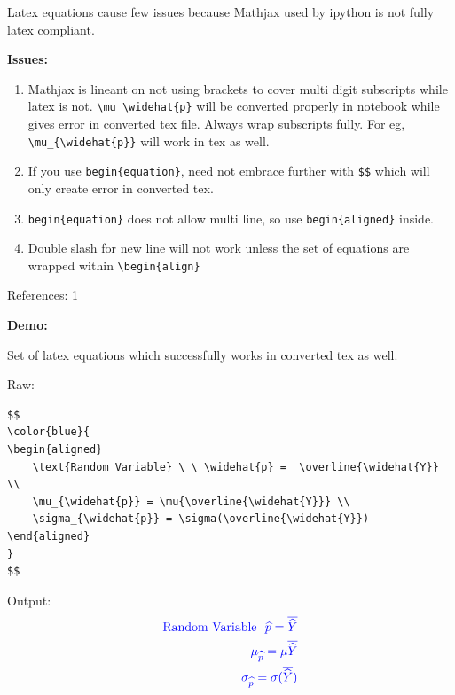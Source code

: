\documentclass[float=false,crop=false]{standalone}
\begin{document}
Latex equations cause few issues because Mathjax used by ipython is not
fully latex compliant.

\textbf{Issues:}

\begin{enumerate}
\def\labelenumi{\arabic{enumi}.}
\tightlist
\item
  Mathjax is lineant on not using brackets to cover multi digit
  subscripts while latex is not.
  \texttt{\textbackslash{}mu\_\textbackslash{}widehat\{p\}} will be
  converted properly in notebook while gives error in converted tex
  file. Always wrap subscripts fully. For eg,
  \texttt{\textbackslash{}mu\_\{\textbackslash{}widehat\{p\}\}} will
  work in tex as well.
\item
  If you use \texttt{begin\{equation\}}, need not embrace further with
  \texttt{\$\$} which will only create error in converted tex.
\item
  \texttt{begin\{equation\}} does not allow multi line, so use
  \texttt{begin\{aligned\}} inside.
\item
  Double slash for new line will not work unless the set of equations
  are wrapped within \texttt{\textbackslash{}begin\{align\}}
\end{enumerate}

References: \href{https://github.com/jupyter/nbconvert/issues/881}{1}

\textbf{Demo:}

Set of latex equations which successfully works in converted tex as
well.

Raw:

\begin{verbatim}
$$
\color{blue}{
\begin{aligned}
    \text{Random Variable} \ \ \widehat{p} =  \overline{\widehat{Y}} \\
    \mu_{\widehat{p}} = \mu{\overline{\widehat{Y}}} \\
    \sigma_{\widehat{p}} = \sigma(\overline{\widehat{Y}})
\end{aligned}
}
$$
\end{verbatim}

Output: \[
\color{blue}{
\begin{aligned}
    \text{Random Variable} \ \ \widehat{p} =  \overline{\widehat{Y}} \\
    \mu_{\widehat{p}} = \mu{\overline{\widehat{Y}}} \\
    \sigma_{\widehat{p}} = \sigma(\overline{\widehat{Y}})
\end{aligned}
}
\]
\end{document}
